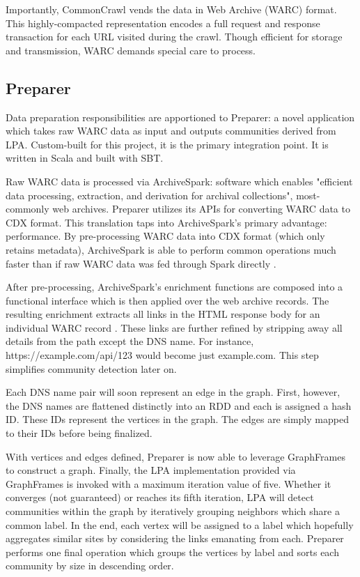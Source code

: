 \documentclass[conference]{IEEEtran}
\begin{document}
Importantly, CommonCrawl vends the data in Web Archive (WARC) format. This highly-compacted representation encodes a full request and response transaction for each URL visited during the crawl. Though efficient for storage and transmission, WARC demands special care to process.

\subsection{Preparer}

Data preparation responsibilities are apportioned to Preparer: a novel application which takes raw WARC data as input and outputs communities derived from LPA. Custom-built for this project, it is the primary integration point. It is written in Scala and built with SBT.

Raw WARC data is processed via ArchiveSpark: software which enables "efficient data processing, extraction, and derivation for archival collections", most-commonly web archives. Preparer utilizes its APIs for converting WARC data to CDX format. This translation taps into ArchiveSpark's primary advantage: performance. By pre-processing WARC data into CDX format (which only retains metadata), ArchiveSpark is able to perform common operations much faster than if raw WARC data was fed through Spark directly \cite{generatingCdx}.

After pre-processing, ArchiveSpark's enrichment functions \cite{enrichmentFunctions} are composed into a functional interface which is then applied over the web archive records. The resulting enrichment extracts all links in the HTML response body for an individual WARC record \cite{linkExtraction}. These links are further refined by stripping away all details from the path except the DNS name. For instance, https://example.com/api/123 would become just example.com. This step simplifies community detection later on.

Each DNS name pair will soon represent an edge in the graph. First, however, the DNS names are flattened distinctly into an RDD and each is assigned a hash ID. These IDs represent the vertices in the graph. The edges are simply mapped to their IDs before being finalized.

With vertices and edges defined, Preparer is now able to leverage GraphFrames to construct a graph. Finally, the LPA implementation provided via GraphFrames is invoked with a maximum iteration value of five. Whether it converges (not guaranteed) or reaches its fifth iteration, LPA will detect communities within the graph by iteratively grouping neighbors which share a common label. In the end, each vertex will be assigned to a label which hopefully aggregates similar sites by considering the links emanating from each. Preparer performs one final operation which groups the vertices by label and sorts each community by size in descending order.
\end{document}
